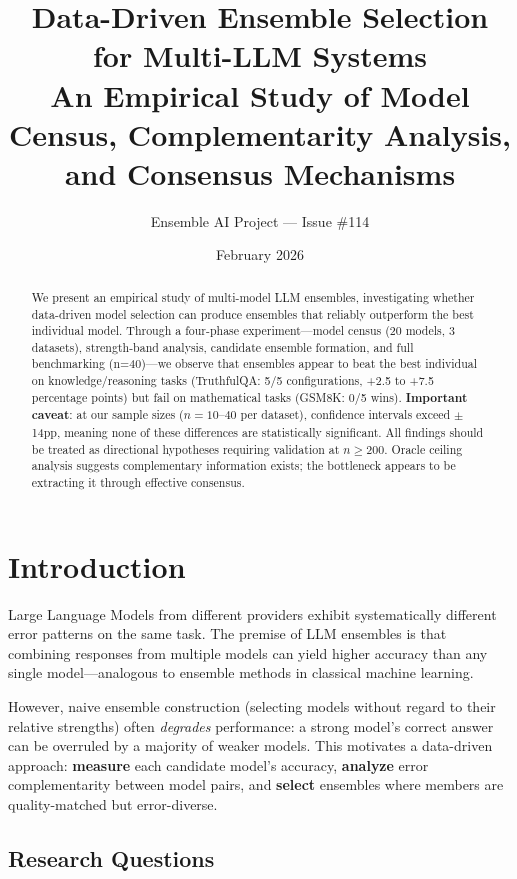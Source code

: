 \documentclass[11pt,a4paper]{article}
\title{\textbf{Data-Driven Ensemble Selection for Multi-LLM Systems}\\[0.5em]
\large An Empirical Study of Model Census, Complementarity Analysis,\\and Consensus Mechanisms}
\author{Ensemble AI Project --- Issue \#114}
\date{February 2026}
\begin{document}
\maketitle

\begin{abstract}
We present an empirical study of multi-model LLM ensembles, investigating whether data-driven model selection can produce ensembles that reliably outperform the best individual model.
Through a four-phase experiment---model census (20 models, 3 datasets), strength-band analysis, candidate ensemble formation, and full benchmarking (n=40)---we observe that ensembles appear to beat the best individual on knowledge/reasoning tasks (TruthfulQA: 5/5 configurations, +2.5 to +7.5 percentage points) but fail on mathematical tasks (GSM8K: 0/5 wins).
\textbf{Important caveat}: at our sample sizes ($n=10$--$40$ per dataset), confidence intervals exceed $\pm$14pp, meaning none of these differences are statistically significant. All findings should be treated as directional hypotheses requiring validation at $n \geq 200$.
Oracle ceiling analysis suggests complementary information exists; the bottleneck appears to be extracting it through effective consensus.
\end{abstract}

\section{Introduction}
\label{sec:intro}

Large Language Models from different providers exhibit systematically different error patterns on the same task.
The premise of LLM ensembles is that combining responses from multiple models can yield higher accuracy than any single model---analogous to ensemble methods in classical machine learning.

However, naive ensemble construction (selecting models without regard to their relative strengths) often \emph{degrades} performance: a strong model's correct answer can be overruled by a majority of weaker models.
This motivates a data-driven approach: \textbf{measure} each candidate model's accuracy, \textbf{analyze} error complementarity between model pairs, and \textbf{select} ensembles where members are quality-matched but error-diverse.

\subsection{Research Questions}
\end{document}

